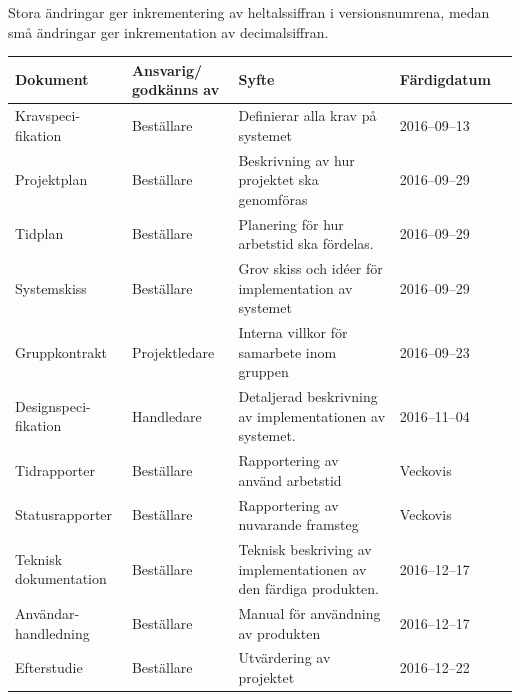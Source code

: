 \documentclass[a4paper,titlepage,12pt]{article}
\begin{document}
	Stora ändringar ger inkrementering av heltalssiffran i versionsnumrena,
	medan små ändringar ger inkrementation av decimalsiffran.
	
	\begin{longtable}[l]{ p{3cm} p{3cm} >{\raggedright}p{5cm} p{2.2cm} l }
		\textbf{Dokument} & \textbf{Ansvarig/ godkänns av} & \textbf{Syfte} & \textbf{Färdigdatum} \\ \midrule
		
		Kravspeci-fikation & Beställare & Definierar alla krav på systemet & 2016--09--13 \\ \midrule

		Projektplan & Beställare & Beskrivning av hur projektet ska genomföras & 2016--09--29 \\ \midrule

		Tidplan & Beställare & Planering för hur arbetstid ska fördelas. & 2016--09--29  \\ \midrule
		
		Systemskiss & Beställare & Grov skiss och idéer för implementation av systemet & 2016--09--29 \\ \midrule

        Gruppkontrakt & Projektledare & Interna villkor för samarbete inom
        gruppen & 2016--09--23 \\ \midrule

		Designspeci-fikation & Handledare & Detaljerad beskrivning av implementationen av systemet. & 2016--11--04 \\ \midrule

		Tidrapporter & Beställare & Rapportering av använd arbetstid & Veckovis		\\ \midrule

		Statusrapporter & Beställare & Rapportering av nuvarande framsteg & Veckovis \\ \midrule

		Teknisk dokumentation & Beställare & Teknisk beskriving av
		implementationen av den färdiga produkten. & 2016--12--17 \\ \midrule

		Användar-handledning & Beställare & Manual för användning av produkten & 2016--12--17 \\ \midrule

		Efterstudie & Beställare & Utvärdering av projektet & 2016--12--22  \\ \midrule
	\end{longtable}
	
\end{document}

